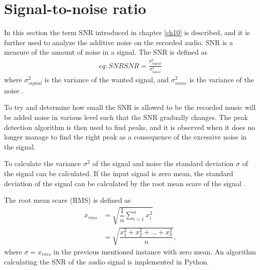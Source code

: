 \section{Signal-to-noise ratio}
In this section the term SNR introduced in chapter \ref{ch10} is described, and it is further used to analyze the additive noise on the recorded audio.
SNR is a measure of the amount of noise in a signal. 
The SNR is defined as
\begin{align} {eq:SNR}
	SNR=\frac{\sigma_{signal}^2}{\sigma_{noise}^2}
\end{align}
where $\sigma_{signal}^2$ is the variance of the wanted signal, and $\sigma_{noise}^2$ is the variance of the noise \cite{page 228, DTSP}.

To try and determine how small the SNR is allowed to be the recorded music will be added noise in various level such that the SNR gradually changes.
The peak detection algorithm is then used to find peaks, and it is observed when it does no longer manage to find the right peak as a consequence of the excessive noise in the signal.

To calculate the variance $\sigma^2$ of the signal and noise the standard deviation $\sigma$ of the signal can be calculated. 
If the input signal is zero mean, the standard deviation of the signal can be calculated by the root mean scare of the signal \cite{page 228, DTSP}.

The root mean scare (RMS) is defined as
\begin{align*}
	x_{rms} 
	&=\sqrt{\dfrac{1}{n} \sum_{i=1}^n x_i^2}\\
	&= \sqrt{\dfrac{x_1^2 + x_2^2 + \dots + x_n^2}{n}},
\end{align*}
where $\sigma = x_{rms}$ in the previous mentioned instance with zero mean. An algorithm calculating the SNR of the audio signal is implemented in Python.

%










